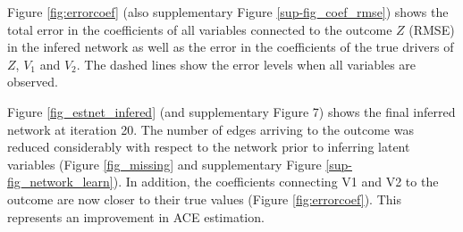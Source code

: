 \documentclass[letterpaper]{article}
\begin{document}
Figure \ref{fig:errorcoef} (also supplementary Figure \ref{sup-fig_coef_rmse}) shows the total error in the coefficients
of all variables connected to the outcome $Z$ (RMSE) in the infered network as
well as the error in the coefficients of the true drivers of $Z$, $V_1$
and $V_2$. The dashed lines show the error levels when all variables are observed.


Figure \ref{fig_estnet_infered}  (and supplementary Figure 7) shows the final inferred network at iteration 20. The number of edges arriving to the outcome was reduced considerably with respect to the network prior to inferring latent variables (Figure \ref{fig_missing} and supplementary Figure \ref{sup-fig_network_learn}). In addition, the coefficients connecting V1 and V2 to the outcome are now closer to their true values (Figure \ref{fig:errorcoef}). This represents an improvement in ACE estimation.
\end{document}
